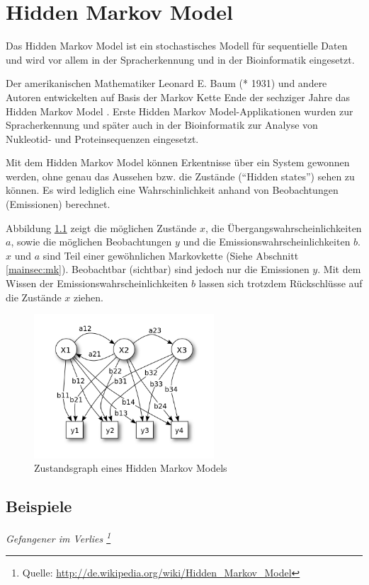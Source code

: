\chapter{Hidden Markov Model}
\label{mainsec:hmm}

Das Hidden Markov Model ist ein stochastisches Modell für sequentielle Daten und wird vor allem in der Spracherkennung und in der Bioinformatik eingesetzt. 

Der amerikanischen Mathematiker Leonard E. Baum (* 1931) und andere Autoren entwickelten auf Basis der Markov Kette Ende der 
sechziger Jahre das Hidden Markov Model \cite{baum66}. Erste Hidden Markov Model-Applikationen wurden zur Spracherkennung und später auch in der Bioinformatik zur Analyse von Nukleotid- und Proteinsequenzen eingesetzt. 

Mit dem Hidden Markov Model können Erkentnisse über ein System gewonnen werden, ohne genau das Aussehen bzw. die Zustände (``Hidden states'') sehen zu können. Es wird lediglich eine Wahrschinlichkeit anhand von Beobachtungen (Emissionen) berechnet. 

Abbildung \ref{fig:hmm_graph} zeigt die möglichen Zustände $x$, die Übergangswahrscheinlichkeiten $a$, sowie die möglichen Beobachtungen $y$ und die Emissionswahrscheinlichkeiten $b$. $x$ und $a$ sind Teil einer gewöhnlichen Markovkette (Siehe Abschnitt \ref{mainsec:mk}). Beobachtbar (sichtbar) sind jedoch nur die Emissionen  $y$. Mit dem Wissen der Emissionswahrscheinlichkeiten $b$ lassen sich trotzdem Rückschlüsse auf die Zustände $x$ ziehen.

\begin{figure}[htbp] \centering
    \includegraphics[width=0.6\textwidth]{Bilder/Kap3/hmm_graph.png}
    \caption{Zustandsgraph eines Hidden Markov Models}
    \label{fig:hmm_graph}
\end{figure}


\section{Beispiele}
\textit{ Gefangener im Verlies \footnote{Quelle: \url{http://de.wikipedia.org/wiki/Hidden_Markov_Model}}} \\


